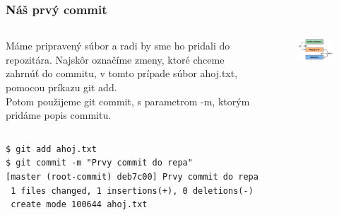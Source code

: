 \documentclass[red]{beamer}
\begin{document}
\begin{frame}[fragile]
\frametitle{Náš prvý commit}   

\begin{columns}
\begin{column}[l]{7cm}
Máme pripravený súbor a radi by sme ho pridali do repozitára. Najskôr označíme zmeny, ktoré chceme zahrnúť do commitu, v tomto prípade súbor ahoj.txt, pomocou príkazu git add. \\
Potom použijeme git commit, s parametrom -m, ktorým pridáme popis commitu.
\end{column}
\begin{column}[r]{5cm}
\begin{figure}
  \centering
  \includegraphics[scale=0.9]{git-pics/staging1.png}
\end{figure}
\end{column}
\end{columns} 
\begin{block}{}
\begin{verbatim}
$ git add ahoj.txt
$ git commit -m "Prvy commit do repa"
[master (root-commit) deb7c00] Prvy commit do repa
 1 files changed, 1 insertions(+), 0 deletions(-)
 create mode 100644 ahoj.txt
\end{verbatim}
\end{block}
\end{frame}
\end{document}
